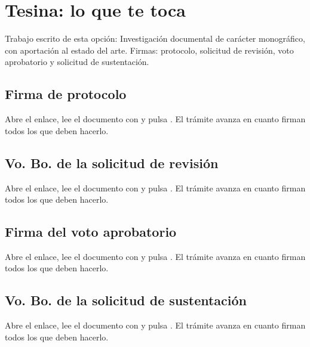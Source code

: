 \section{Tesina: lo que te toca}
Trabajo escrito de esta opción: Investigación documental de carácter monográfico, con aportación al estado del arte. Firmas: protocolo, solicitud de revisión, voto aprobatorio y solicitud de sustentación.
\subsection{Firma de protocolo}
Abre el enlace, lee el documento con  y pulsa . El trámite avanza en cuanto firman todos los que deben hacerlo.
\subsection{Vo. Bo. de la solicitud de revisión}
Abre el enlace, lee el documento con  y pulsa . El trámite avanza en cuanto firman todos los que deben hacerlo.
\subsection{Firma del voto aprobatorio}
Abre el enlace, lee el documento con  y pulsa . El trámite avanza en cuanto firman todos los que deben hacerlo.
\subsection{Vo. Bo. de la solicitud de sustentación}
Abre el enlace, lee el documento con  y pulsa . El trámite avanza en cuanto firman todos los que deben hacerlo.
